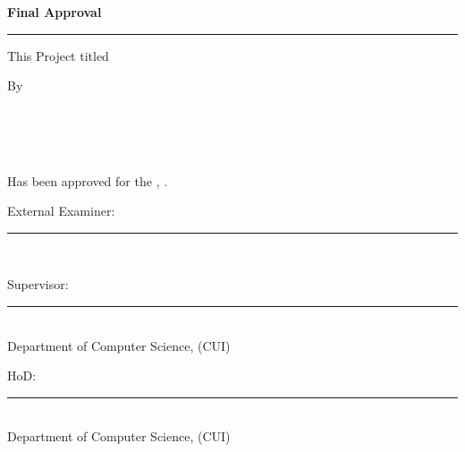 \begin{center}
{\LARGE\bfseries Final Approval\par}\vspace{2pt}\rule{\linewidth}{0.5pt}\vspace{0.6cm}

{\large This Project titled\par}\vspace{0.4cm}
{\fontsize{20}{26}\selectfont \projecttitle\par}\vspace{1cm}
{\large By\par}\vspace{0.8cm}
{\large\itshape \studentA\\ \regA\\ \studentB\\ \regB\par}\vspace{1cm}
{\large Has been approved for the \university, \campus.\par}
\end{center}
\vspace{0.6cm}
{\large External Examiner: \rule{0.6\linewidth}{0.4pt}\par}
\begin{center}{\large \examiner\\ \examinerorg\par}\end{center}
\vspace{0.4cm}
{\large Supervisor: \rule{0.66\linewidth}{0.4pt}\par}
\begin{center}{\large \supervisor\\ Department of Computer Science, (CUI) \campus\par}\end{center}
\vspace{0.4cm}
{\large HoD: \rule{0.75\linewidth}{0.4pt}\par}
\begin{center}{\large \hod\\ Department of Computer Science, (CUI) \campus\par}\end{center}
\clearpage

